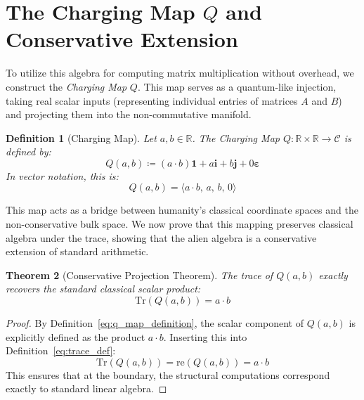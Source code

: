\documentclass[11pt,a4paper]{book}
\newtheorem{theorem}{Theorem}
\newtheorem{definition}[theorem]{Definition}
\begin{document}
\section{The Charging Map $Q$ and Conservative Extension}
\label{sec:charging_map_q}

To utilize this algebra for computing matrix multiplication without overhead, we construct the \textit{Charging Map} $Q$. 
This map serves as a quantum-like injection, taking real scalar inputs (representing individual entries of matrices $A$ and $B$) and projecting them into the non-commutative manifold.

\begin{definition}[Charging Map]
Let $a, b \in \mathbb{R}$. The Charging Map $Q: \mathbb{R} \times \mathbb{R} \to \mathcal{C}$ is defined by:
\begin{equation}
\label{eq:q_map_definition}
Q(a, b) \coloneqq (a \cdot b) \mathbf{1} + a \mathbf{i} + b \mathbf{j} + 0 \boldsymbol{\varepsilon}
\end{equation}
In vector notation, this is:
\begin{equation}
Q(a, b) = \langle a \cdot b, \, a, \, b, \, 0 \rangle
\end{equation}
\end{definition}

This map acts as a bridge between humanity's classical coordinate spaces and the non-conservative bulk space. 
We now prove that this mapping preserves classical algebra under the trace, showing that the alien algebra is a conservative extension of standard arithmetic.

\begin{theorem}[Conservative Projection Theorem]
\label{thm:conservative_projection}
The trace of $Q(a, b)$ exactly recovers the standard classical scalar product:
\begin{equation}
\text{Tr}(Q(a, b)) = a \cdot b
\end{equation}
\end{theorem}

\begin{proof}
By Definition~\ref{eq:q_map_definition}, the scalar component of $Q(a, b)$ is explicitly defined as the product $a \cdot b$. 
Inserting this into Definition~\ref{eq:trace_def}:
\begin{equation}
\text{Tr}(Q(a, b)) = \text{re}(Q(a, b)) = a \cdot b
\end{equation}
This ensures that at the boundary, the structural computations correspond exactly to standard linear algebra.
\end{proof}
\end{document}
